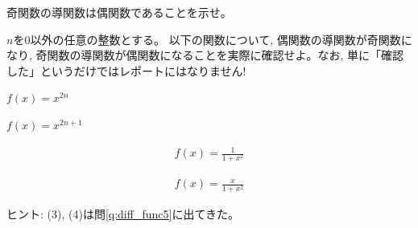 \begin{q}\label{q:diff_odd} 奇関数の導関数は偶関数であることを示せ。\end{q}
\mv

\begin{q}\label{q:diff_oddeven} $n$を0以外の任意の整数とする。
以下の関数について, 偶関数の導関数が奇関数になり, 
奇関数の導関数が偶関数になることを実際に確認せよ。なお, 
単に「確認した」というだけではレポートにはなりません!
\begin{edaenumerate}
\item $f(x)=x^{2n}$
\item $f(x)=x^{2n+1}$
\item \begin{eqnarray*}f(x)=\frac{1}{1+x^2}\end{eqnarray*}
\item \begin{eqnarray*}f(x)=\frac{x}{1+x^2}\end{eqnarray*}
\end{edaenumerate}\end{q}
ヒント: (3), (4)は問\ref{q:diff_func5}に出てきた。\mv




